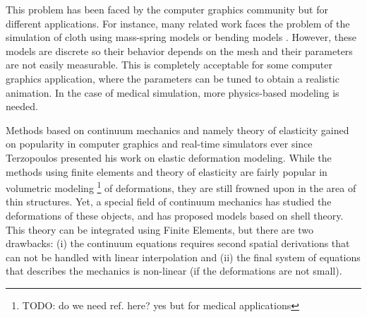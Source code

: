 \documentclass{egpubl}
\begin{document}
This problem has been faced by the computer graphics community but for different applications.
For instance, many related work faces the problem of the simulation of cloth using mass-spring models \cite{Volino2009} or bending models \cite{Grinspun2003,Choi2007}. %
However, these models are discrete so their behavior depends on the mesh and their parameters are not easily measurable.
This is completely acceptable for some computer graphics application, where the parameters can be tuned to obtain a realistic animation.
In the case of medical simulation, more physics-based modeling is needed.


Methods based on continuum mechanics and namely theory of elasticity gained on popularity in computer graphics and real-time simulators ever since Terzopoulos \cite{Terzopoulos1987} presented his work on elastic deformation modeling.  %
While the methods using finite elements and theory of elasticity are fairly popular in volumetric modeling \footnote{TODO: do we need ref. here?  yes but for medical applications} of deformations, they are still frowned upon in the area of thin structures. 
Yet, a special field of continuum mechanics has studied the deformations of these objects, and has proposed models based on shell theory.
This theory can be integrated using Finite Elements, but there are two drawbacks: (i) the continuum equations requires second spatial derivations that can not be handled with linear interpolation and (ii) the final system of equations that describes the mechanics is non-linear (if the deformations are not small).
\end{document}
